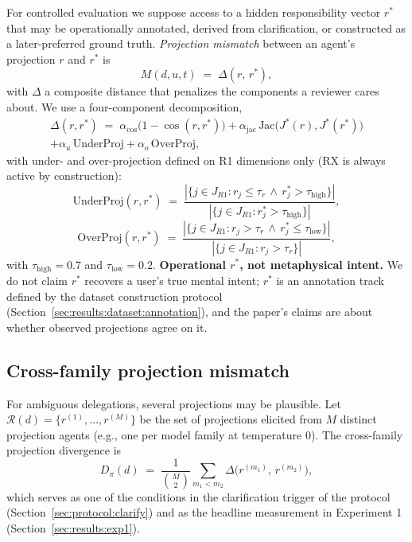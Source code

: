 For controlled evaluation we suppose access to a hidden responsibility vector $r^*$ that may be operationally annotated, derived from clarification, or constructed as a later-preferred ground truth. \emph{Projection mismatch} between an agent's projection $r$ and $r^*$ is
\begin{equation}
M(d, u, t) \;=\; \Delta(r,\, r^*),
\label{eq:mismatch}
\end{equation}
with $\Delta$ a composite distance that penalizes the components a reviewer cares about. We use a four-component decomposition,
\begin{multline}
\Delta(r, r^*) \;=\; \alpha_{\cos}\bigl(1 - \cos(r, r^*)\bigr) + \alpha_{\text{jac}}\,\text{Jac}\bigl(J^*(r), J^*(r^*)\bigr) \\
+ \alpha_{u}\,\text{UnderProj} + \alpha_{o}\,\text{OverProj},
\label{eq:delta}
\end{multline}
with under- and over-projection defined on R1 dimensions only (RX is always active by construction):
\begin{equation}
\text{UnderProj}(r, r^*) \;=\; \frac{|\{ j \in J_{R1} : r_j \leq \tau_r \,\land\, r^*_j > \tau_{\text{high}} \}|}{|\{ j \in J_{R1} : r^*_j > \tau_{\text{high}} \}|},
\label{eq:under}
\end{equation}
\begin{equation}
\text{OverProj}(r, r^*) \;=\; \frac{|\{ j \in J_{R1} : r_j > \tau_r \,\land\, r^*_j \leq \tau_{\text{low}} \}|}{|\{ j \in J_{R1} : r_j > \tau_r \}|},
\label{eq:over}
\end{equation}
with $\tau_{\text{high}} = 0.7$ and $\tau_{\text{low}} = 0.2$. \textbf{Operational $r^*$, not metaphysical intent.} We do not claim $r^*$ recovers a user's true mental intent; $r^*$ is an annotation track defined by the dataset construction protocol (Section~\ref{sec:results:dataset:annotation}), and the paper's claims are about whether observed projections agree on it.

\subsection{Cross-family projection mismatch}
\label{sec:problem:cross_family}

For ambiguous delegations, several projections may be plausible. Let $\mathcal{R}(d) = \{ r^{(1)}, \dots, r^{(M)} \}$ be the set of projections elicited from $M$ distinct projection agents (e.g., one per model family at temperature $0$). The cross-family projection divergence is
\begin{equation}
D_\pi(d) \;=\; \frac{1}{\binom{M}{2}} \sum_{m_1 < m_2} \Delta\bigl( r^{(m_1)},\, r^{(m_2)} \bigr),
\label{eq:dpi}
\end{equation}
which serves as one of the conditions in the clarification trigger of the protocol (Section~\ref{sec:protocol:clarify}) and as the headline measurement in Experiment 1 (Section~\ref{sec:results:exp1}).

